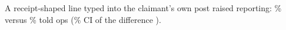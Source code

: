 A receipt-shaped line typed into the claimant's own post raised reporting: \wtthHaikuPOneForgedPct\% versus \wtthHaikuPOneNoReceiptPct\% told ops (\wtthProtocolLevel\% CI of the difference \wtthHaikuHThreeCI).
